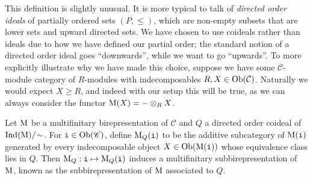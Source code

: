 \noindent\begin{remark} This definition is slightly unusual. It is more typical to talk of {\em directed order ideals} of partially ordered sets $(P, \leq)$, which are non-empty subsets that are lower sets and upward directed sets. We have chosen to use coideals rather than ideals due to how we have defined our partial order; the standard notion of a directed order ideal goes ``downwards'', while we want to go ``upwards''. To more explicitly illustrate why we have made this choice, suppose we have some $\mathcal{C}$-module category of $R$-modules with indecomposables $R, X \in \textup{Ob}(\mathcal{C})$. Naturally we would expect $X \geq R$, and indeed with our setup this will be true, as we can always consider the functor $\textup{M}(X) = - \otimes_R X$.\\
\end{remark}


\noindent Let $\textup{M}$ be a multifinitary birepresentation of $\mathscr{C}$ and $Q$ a directed order coideal of $\textup{Ind}(\textup{M})/\!\sim$. For $\textup{\texttt{i}} \in \textup{Ob}(\mathscr{C})$, define $\textup{M}_Q(\textup{\texttt{i}})$ to be the additive subcategory of $\textup{M}(\textup{\texttt{i}})$ generated by every indecomposable object $X \in \textup{Ob}(\textup{M}(\textup{\texttt{i}}))$ whose equivalence class lies in $Q$. Then $\textup{M}_Q : \textup{\texttt{i}} \mapsto \textup{M}_Q(\textup{\texttt{i}})$ induces a multifinitary subbirepresentation of $\textup{M}$, known as the subbirepresentation of $\textup{M}$ associated to $Q$.\\

